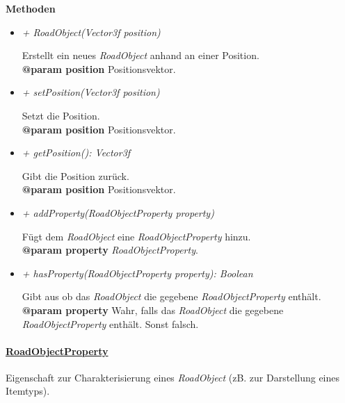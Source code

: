         \textbf{Methoden}
        \begin{itemize}

            \item  \textit{+ RoadObject(Vector3f position)}
                \begin{leftbar}[0.9\linewidth]
                    Erstellt ein neues \textit{RoadObject} anhand an einer Position.\\
                    \textbf{@param position} Positionsvektor.
                \end{leftbar}

            \item  \textit{+ setPosition(Vector3f position)}
                \begin{leftbar}[0.9\linewidth]
                    Setzt die Position.\\
                    \textbf{@param position} Positionsvektor.
                \end{leftbar}
            
            \item  \textit{+ getPosition(): Vector3f}
                \begin{leftbar}[0.9\linewidth]
                    Gibt die Position zurück.\\
                    \textbf{@param position} Positionsvektor.
                \end{leftbar}

            \item  \textit{+ addProperty(RoadObjectProperty property)}
                \begin{leftbar}[0.9\linewidth]
                    Fügt dem \textit{RoadObject} eine \textit{RoadObjectProperty} hinzu.\\
                    \textbf{@param property} \textit{RoadObjectProperty}.
                \end{leftbar}
            
            \item  \textit{+ hasProperty(RoadObjectProperty property): Boolean}
                \begin{leftbar}[0.9\linewidth]
                    Gibt aus ob das \textit{RoadObject} die gegebene \textit{RoadObjectProperty} enthält.\\
                    \textbf{@param property} Wahr, falls das \textit{RoadObject} die gegebene \textit{RoadObjectProperty} enthält. Sonst falsch.
                \end{leftbar}
            \end{itemize}
    \paragraph{\underline{RoadObjectProperty}} \mbox{}\par
        Eigenschaft zur Charakterisierung eines \textit{RoadObject}
        (zB. zur Darstellung eines Itemtyps).\par